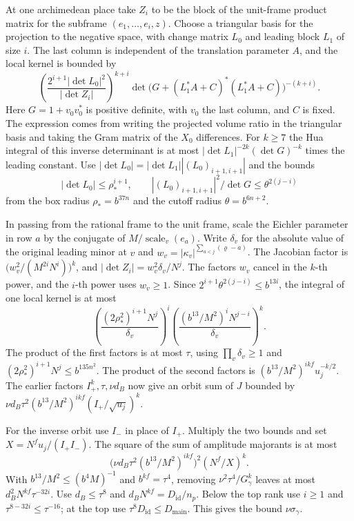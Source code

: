 At one archimedean place take \(Z_i\) to be the block of the unit-frame
product matrix for the subframe \((e_1,\ldots,e_i,z)\).
Choose a triangular basis for the projection to the negative space,
with change matrix \(L_0\) and leading block \(L_1\) of size \(i\).
The last column is independent of the translation parameter \(A\), and
the local kernel is bounded by
\[
 \left(\frac{2^{i+1}|\det L_0|^2}{|\det Z_i|}\right)^{k+i}
 \det\!\bigl(G+(L_1^*A+C)^*(L_1^*A+C)\bigr)^{-(k+i)} .
\]
Here \(G=1+v_0v_0^*\) is positive definite, with \(v_0\) the last
column, and \(C\) is fixed. The expression comes from writing the
projected volume ratio in the triangular basis and taking the Gram
matrix of the \(X_0\) differences.
For \(k\ge7\) the Hua integral of this inverse determinant is at most
\(|\det L_1|^{-2k}(\det G)^{-k}\) times the leading constant.
Use \(|\det L_0|=|\det L_1||(L_0)_{i+1,i+1}|\) and the bounds
\[
 |\det L_0|\le\rho_\ast^{i+1},\qquad
 |(L_0)_{i+1,i+1}|^2/\det G\le\theta^{2(j-i)}
\]
from the box radius \(\rho_\ast=b^{37n}\) and the cutoff radius
\(\theta=b^{6n+2}\).

In passing from the rational frame to the unit frame, scale the
Eichler parameter in row \(a\) by the conjugate of
\(M/\operatorname{scale}_v(e_a)\).
Write \(\delta_v\) for the absolute value of the original leading minor
at \(v\) and \(w_v=|\kappa_v|^{\sum_{a<j}(\varrho-a)}\).
The Jacobian factor is \(\bigl(w_v^2/(M^{2i}N^i)\bigr)^k\), and
\(|\det Z_i|=w_v^2\delta_v/N^j\).
The factors \(w_v\) cancel in the \(k\)-th power, and the \(i\)-th power
uses \(w_v\ge1\). Since \(2^{i+1}\theta^{2(j-i)}\le b^{13i}\), the
integral of one local kernel is at most
\[
 \left(\frac{(2\rho_\ast^2)^{i+1}N^j}{\delta_v}\right)^i
 \left(\frac{(b^{13}/M^2)^i N^{j-i}}{\delta_v}\right)^k .
\]
The product of the first factors is at most \(\tau\), using
\(\prod_v\delta_v\ge1\) and
\((2\rho_\ast^2)^{i+1}N^j\le b^{135n^2}\).
The product of the second factors is
\((b^{13}/M^2)^{ikf}u_j^{-k/2}\).
The earlier factors \(I_+^k,\tau,\nu d_B\) now give an orbit sum of
\(J\) bounded by
\(\nu d_B\tau^2(b^{13}/M^2)^{ikf}(I_+/\sqrt{u_j})^k\).

For the inverse orbit use \(I_-\) in place of \(I_+\).
Multiply the two bounds and set \(X=N^fu_j/(I_+I_-)\).
The square of the sum of amplitude majorants is at most
\[
  \bigl(\nu d_B\tau^2(b^{13}/M^2)^{ikf}\bigr)^2(N^f/X)^k .
\]
With \(b^{13}/M^2\le(b^4M)^{-1}\) and \(b^{kf}=\tau^4\), removing
\(\nu^2\tau^4/G_\gamma^k\) leaves at most \(d_B^2N^{kf}\tau^{-32i}\).
Use \(d_B\le\tau^8\) and \(d_B N^{kf}=D_{\mathrm{id}}/n_p\).
Below the top rank use \(i\ge1\) and \(\tau^{8-32i}\le\tau^{-16}\);
at the top use \(\tau^8D_{\mathrm{id}}\le D_{\mathrm{main}}\).
This gives the bound \(\nu\sigma_\gamma\).

